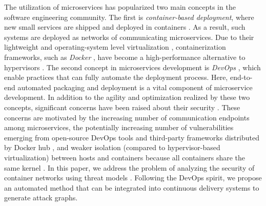 The utilization of microservices has popularized two main concepts in the software engineering community. The first is \textit{container-based deployment}, where new small services are shipped and deployed in containers \cite{jaramillo2016leveraging}. As a result, such systems are deployed as networks of communicating microservices. Due to their lightweight and operating-system level virtualization \cite{bottomely}, containerization frameworks, such as \textit{Docker} \cite{cerny2018contextual}, have become a high-performance alternative to hypervisors \cite{kratzke2017microservices}. The second concept in microservices development is \textit{DevOps} \cite{cerny2018contextual}, which enable practices that can fully automate the deployment process. Here, end-to-end automated packaging and deployment is a vital component of microservice development. In addition to the agility and optimization realized by these two concepts, significant concerns have been raised about their security \cite{ahmadvand2016requirements}. These concerns are motivated by the increasing number of communication endpoints among microservices, the potentially increasing number of vulnerabilities emerging from open-source DevOps tools and third-party frameworks distributed by Docker hub \cite{shu2017study,gummaraju2015over}, and weaker isolation (compared to hypervisor-based virtualization) between hosts and containers because all containers share the same kernel \cite{bottomely, bui2015analysis}. In this paper, we address the problem of analyzing the security of container networks using threat models \cite{kordy2014dag}. Following the DevOps spirit, we propose an automated method that can be integrated into continuous delivery systems to generate attack graphs.



